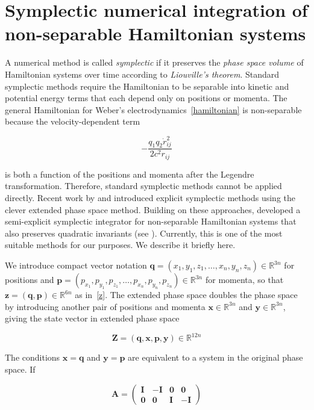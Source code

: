 \documentclass[12pt,a4paper]{article}
\theoremstyle{definition}
\theoremstyle{remark}
\newcommand{\qq}{q_1 q_2}
\begin{document}
\section{Symplectic numerical integration of non-separable Hamiltonian systems}\label{symplectic}
A numerical method is called \textit{symplectic} if it preserves the \textit{phase space volume} of Hamiltonian systems over time according to \textit{Liouville's theorem}. Standard symplectic methods require the Hamiltonian to be separable into kinetic and potential energy terms that each depend only on positions or momenta. The general Hamiltonian for Weber's electrodynamics~\eqref{hamiltonian} is non-separable because the velocity-dependent term

\begin{equation}
    -\frac{\qq \dot{r}_{ij}^2}{2 c^2 r_{ij}}
\end{equation}

is both a function of the positions and momenta after the Legendre transformation. Therefore, standard symplectic methods cannot be applied directly. Recent work by \citet{Pihajoki2015} and \citet{Tao2016} introduced explicit symplectic methods using the clever extended phase space method. Building on these approaches, \citet{Jayawardana2023} developed a semi-explicit symplectic integrator for non-separable Hamiltonian systems that also preserves quadratic invariants (see \citep{Ohsawa2023}). Currently, this is one of the most suitable methods for our purposes. We describe it briefly here.

We introduce compact vector notation $\mathbf{q} = (x_1, y_1, z_1, \ldots, x_n, y_n, z_n) \in \mathbb{R}^{3n}$ for positions and $\mathbf{p} = (p_{x_1}, p_{y_1}, p_{z_1}, \ldots, p_{x_n}, p_{y_n}, p_{z_n}) \in \mathbb{R}^{3n}$ for momenta, so that $\mathbf{z} = (\mathbf{q}, \mathbf{p}) \in \mathbb{R}^{6n}$ as in~\eqref{z}. The extended phase space doubles the phase space by introducing another pair of positions and momenta $\mathbf{x} \in \mathbb{R}^{3n}$ and $\mathbf{y} \in \mathbb{R}^{3n}$, giving the state vector in extended phase space

\begin{equation}\label{Z}
    \mathbf{Z} = (\mathbf{q}, \mathbf{x}, \mathbf{p}, \mathbf{y}) \in \mathbb{R}^{12n}
\end{equation}

The conditions $\mathbf{x} = \mathbf{q}$ and $\mathbf{y} = \mathbf{p}$ are equivalent to a system in the original phase space. If

\begin{equation}
    \mathbf{A} = \begin{pmatrix}
        \mathbf{I} & -\mathbf{I} & \mathbf{0} & \mathbf{0}  \\
        \mathbf{0} & \mathbf{0}  & \mathbf{I} & -\mathbf{I}
    \end{pmatrix}
\end{equation}
\end{document}
